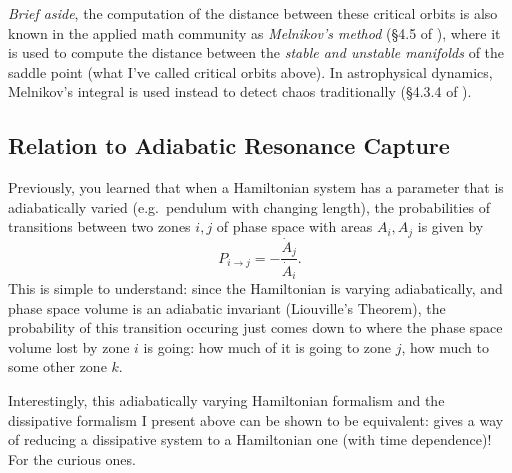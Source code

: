 \documentclass[11pt,
        usenames, %
        dvipsnames %
    ]{article}
\begin{document}
\emph{Brief aside}, the computation of the distance between these critical
orbits is also known in the applied math community as \emph{Melnikov's method}
(\S4.5 of \citealp{guckenheimer2013nonlinear}), where it is used to compute the
distance between the \emph{stable and unstable manifolds} of the saddle point
(what I've called critical orbits above). In astrophysical dynamics, Melnikov's
integral is used instead to detect chaos traditionally (\S4.3.4 of
\citealp{2002morbidelli}).

\subsection{Relation to Adiabatic Resonance Capture}

Previously, you learned that when a Hamiltonian system has a parameter that is
adiabatically varied (e.g.\ pendulum with changing length), the probabilities of
transitions between two zones $i, j$ of phase space with areas $A_i, A_j$ is
given by
\begin{equation}
    P_{i\to j} = -\frac{\dot{A}_j}{\dot{A}_i}.
\end{equation}
This is simple to understand: since the Hamiltonian is varying adiabatically,
and phase space volume is an adiabatic invariant (Liouville's Theorem), the
probability of this transition occuring just comes down to where the phase space
volume lost by zone $i$ is going: how much of it is going to zone $j$, how much
to some other zone $k$.

Interestingly, this adiabatically varying Hamiltonian formalism and the
dissipative formalism I present above can be shown to be equivalent:
\citet{henrard1993adiabatic} gives a way of reducing a dissipative system to a
Hamiltonian one (with time dependence)! For the curious ones.



\end{document}
